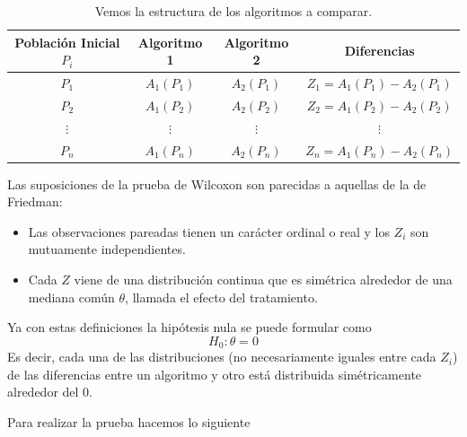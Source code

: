 \begin{table}[H]
    \centering
    \begin{tabular}{|c|c|c|c|}
    \textbf{Población Inicial $P_i$} & \textbf{Algoritmo 1} & \textbf{Algoritmo 2} & \textbf{Diferencias}    \\ \hline
    $P_1$                            & $A_1(P_1)$           & $A_2(P_1)$           & $Z_1=A_1(P_1)-A_2(P_1)$ \\
    $P_2$                            & $A_1(P_2)$           & $A_2(P_2)$           & $Z_2=A_1(P_2)-A_2(P_2)$ \\
    $\vdots$                         & $\vdots$             & $\vdots$             & $\vdots$                \\
    $P_n$                            & $A_1(P_n)$           & $A_2(P_n)$           & $Z_n=A_1(P_n)-A_2(P_n)$
    \end{tabular}
\caption[Algoritmos a comparar]{Vemos la estructura de los algoritmos a comparar.}
\label{tab:datos_pareados}
\end{table}


Las suposiciones de la prueba de Wilcoxon \cite{hollanderNonparametricStatisticalMethods2015} son parecidas a aquellas de la de Friedman:

\begin{itemize}
    \item Las observaciones pareadas tienen un carácter ordinal o real y los $Z_i$ son mutuamente independientes. 
    \item Cada $Z$ viene de una distribución continua que es simétrica alrededor de una mediana común $\theta$, llamada el efecto del tratamiento.
\end{itemize}

Ya con estas definiciones la hipótesis nula se puede formular como $$ H_0: \theta=0 $$
Es decir, cada una de las distribuciones (no necesariamente iguales entre cada $Z_i$)  de las diferencias entre un algoritmo y otro está distribuida simétricamente alrededor del 0. 

Para realizar la prueba hacemos lo siguiente 


